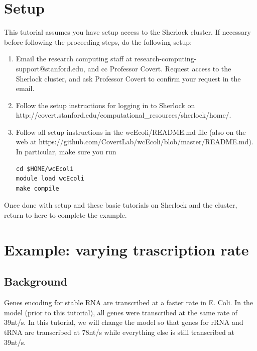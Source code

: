 \documentclass[12pt]{article}
\begin{document}
\section{Setup}
\label{sec:setup}

This tutorial assumes you have setup access to the Sherlock cluster. If necessary before following the proceeding steps, do the following setup:

\begin{enumerate}
\item Email the research computing staff at research-computing-support@stanford.edu, and cc Professor Covert. Request access to the Sherlock cluster, and ask Professor Covert to confirm your request in the email.

\item Follow the setup instructions for logging in to Sherlock on
\linebreak
http://covert.stanford.edu/computational\_resources/sherlock/home/.

\item Follow all setup instructions in the wcEcoli/README.md file (also on the web at https://github.com/CovertLab/wcEcoli/blob/master/README.md). In particular, make sure you run
\lstset{language=bash}
\begin{lstlisting}
cd $HOME/wcEcoli
module load wcEcoli
make compile
\end{lstlisting}
\end{enumerate}

Once done with setup and these basic tutorials on Sherlock and the cluster, return to here to complete the example.



\section{Example: varying trascription rate}

\subsection{Background}

Genes encoding for stable RNA are transcribed at a faster rate in E. Coli. In the model (prior to this tutorial), all genes were transcribed at the same rate of 39nt/s. In this tutorial, we will change the model so that genes for rRNA and tRNA are transcribed at 78nt/s while everything else is still transcribed at 39nt/s. 
\par
\end{document}
